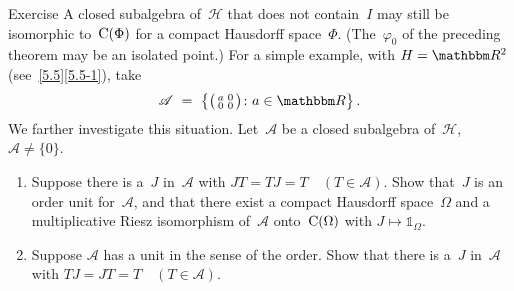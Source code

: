 \documentclass[main.tex]{subfiles}
\begin{document}
%
%
\begin{psec}{5.31}{Exercise}
A closed subalgebra of~$\mathscr H$
that does not contain~$I$
may still be isomorphic to~$\mathrm{C}(\Phi)$
for a compact Hausdorff space~$\Phi$.
(The~$\varphi_0$ of the preceding theorem may be an isolated point.)
For a simple example, with $H=\R^2$ (see~\ref{5.5}\ref{5.5-1}), take
\begin{equation*}
\mathscr A\ =\ \left\{
\bigl(\begin{smallmatrix}a & 0 \\ 0 & 0\end{smallmatrix}\bigr)
\colon a\in\R\right\}\htam{.}
\end{equation*}
We farther investigate this situation.
Let~$\mathscr A$ be a closed subalgebra of~$\mathscr H$,
$\mathscr A\neq \{0\}$.
\begin{enumerate}
\item\label{5.31-1}
Suppose there is a~$J$ in~$\mathscr A$ with $JT=TJ=T\quad(T\in\mathscr A)$.
Show that~$J$ is an order unit for~$\mathscr A$,
and that there exist a compact Hausdorff space~$\Omega$
and a multiplicative Riesz isomorphism of~$\mathscr A$
onto~$\mathrm{C}(\Omega)$ with $J\mapsto \mathbb{1}_\Omega$.
%
\item\label{5.31-2}
Suppose $\mathscr A$ has a unit
in the sense of the order.
Show that there is a~$J$ in~$\mathscr A$ with $TJ=JT=T\quad(T\in \mathscr A)$.
\end{enumerate}
\end{psec}
%
%
\end{document}
